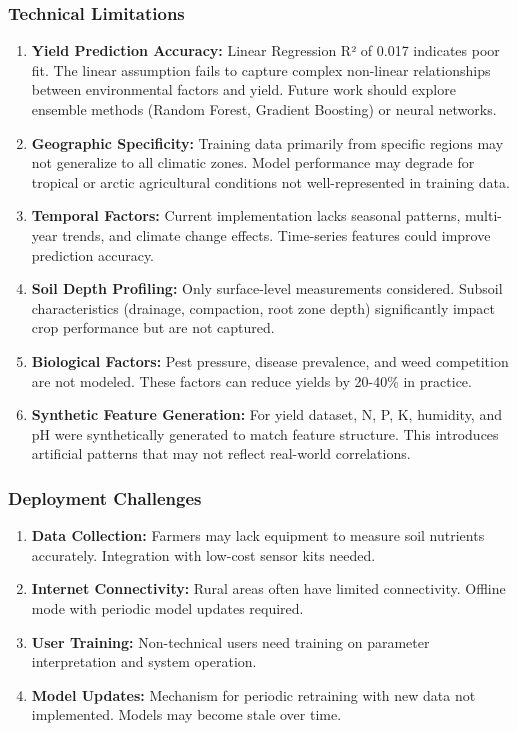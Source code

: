 \documentclass[conference]{IEEEtran}
\begin{document}
\subsubsection{Technical Limitations}
\begin{enumerate}
    \item \textbf{Yield Prediction Accuracy:} Linear Regression R² of 0.017 indicates poor fit. The linear assumption fails to capture complex non-linear relationships between environmental factors and yield. Future work should explore ensemble methods (Random Forest, Gradient Boosting) or neural networks.
    
    \item \textbf{Geographic Specificity:} Training data primarily from specific regions may not generalize to all climatic zones. Model performance may degrade for tropical or arctic agricultural conditions not well-represented in training data.
    
    \item \textbf{Temporal Factors:} Current implementation lacks seasonal patterns, multi-year trends, and climate change effects. Time-series features could improve prediction accuracy.
    
    \item \textbf{Soil Depth Profiling:} Only surface-level measurements considered. Subsoil characteristics (drainage, compaction, root zone depth) significantly impact crop performance but are not captured.
    
    \item \textbf{Biological Factors:} Pest pressure, disease prevalence, and weed competition are not modeled. These factors can reduce yields by 20-40\% in practice.
    
    \item \textbf{Synthetic Feature Generation:} For yield dataset, N, P, K, humidity, and pH were synthetically generated to match feature structure. This introduces artificial patterns that may not reflect real-world correlations.
\end{enumerate}

\subsubsection{Deployment Challenges}
\begin{enumerate}
    \item \textbf{Data Collection:} Farmers may lack equipment to measure soil nutrients accurately. Integration with low-cost sensor kits needed.
    
    \item \textbf{Internet Connectivity:} Rural areas often have limited connectivity. Offline mode with periodic model updates required.
    
    \item \textbf{User Training:} Non-technical users need training on parameter interpretation and system operation.
    
    \item \textbf{Model Updates:} Mechanism for periodic retraining with new data not implemented. Models may become stale over time.
\end{enumerate}
\end{document}
